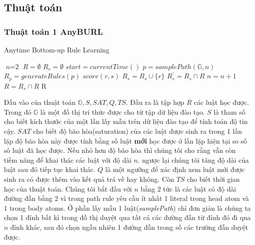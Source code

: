 \subsection{Thuật toán}

\subsubsection{Thuật toán 1 AnyBURL}
\begin{algorithm}
\caption{Anytime Bottom-up Rule Learning}\label{euclid}
\begin{algorithmic}[1]
\State $\textit{n} = \text{2}$
\State $R = \emptyset$
\Loop
\State $R_s = \emptyset$
\State $start = currentTime()$
\Repeat
\State $p = samplePath(\mathbb{G}, n)$
\State $R_p = generateRules(p)$
\State $score(r, s)$
	\State $R_s = R_s \cup \{r\}$
\EndIf
\EndFor
{}
\State $R^{\prime}_s = R_s \cap R$
	\State $n = n + 1$
\EndIf
\State $R = R_s \cap R$
\EndLoop
\Return R
\EndProcedure
\end{algorithmic}
\end{algorithm}

Đầu vào của thuật toán \(\mathbb{G}, S, SAT, Q, TS\). Đầu ra là tập hợp \(R\) các luật học được. Trong đó \(\mathbb{G}\) là một đồ thị tri thức được cho từ tập dữ liệu đào tạo. \(S\) là tham số cho biết kích thước của một lần lấy mẫu trên dữ liệu đào tạo để tính toán độ tin cậy. \(SAT\) cho biết độ bão hòa(saturation) của các luật được sinh ra trong 1 lần lặp độ bão hòa này được tính bằng số luật \textbf{mới} học được ở lần lặp hiện tại so số sô luật đã học được. Nếu nhỏ hơn độ bão hòa thì chúng tôi cho rằng vẫn còn tiềm năng để khai thác các luật với độ dài \(n\). ngược lại chúng tôi tăng độ dài của luật sau đó tiếp tục khai thác. \(Q\) là một ngưỡng để xác định xem luật mới được sinh ra có được thêm vào kết quả trả về hay không. Còn \(TS\) cho biết thời gian học của thuật toán. Chúng tôi bắt đầu với \(n\) bằng \(2\) tức là các luật có độ dài đường đẫn bằng 2 vì trong path rule yêu cầu ít nhất 1 literal trong head atom và 1 trong body atoms. Ở phần lấy mẫu 1 luật(\textit{samplePath}) chỉ đơn giản là chúng ta chọn 1 đỉnh bất kì trong đồ thị duyệt qua tất cả các đường đẫn từ đỉnh đó đi qua \(n\) đỉnh khác, sau đó chọn ngẫu nhiên 1 đường đẫn trong số các trường đẫn duyệt được.

